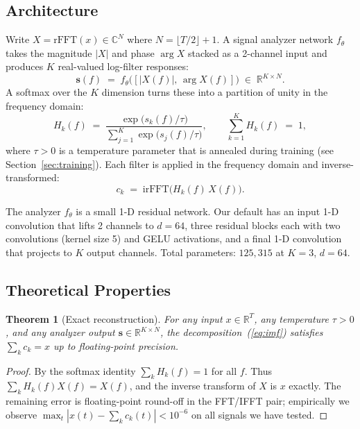 \documentclass[journal]{IEEEtran}
\newtheorem{theorem}{Theorem}
\begin{document}
\subsection{Architecture}

Write $X = \mathrm{rFFT}(x) \in \mathbb{C}^{N}$ where $N = \lfloor T/2 \rfloor + 1$. A signal analyzer network $f_{\theta}$ takes the magnitude $|X|$ and phase $\arg X$ stacked as a 2-channel input and produces $K$ real-valued log-filter responses:
\begin{equation}
\mathbf{s}(f) \;=\; f_{\theta}\bigl([|X(f)|,\, \arg X(f)]\bigr) \;\in\; \mathbb{R}^{K \times N}.
\label{eq:analyzer}
\end{equation}
A softmax over the $K$ dimension turns these into a partition of unity in the frequency domain:
\begin{equation}
H_{k}(f) \;=\; \frac{\exp\!\bigl(s_{k}(f) / \tau\bigr)}{\sum_{j=1}^{K} \exp\!\bigl(s_{j}(f) / \tau\bigr)},
\qquad
\sum_{k=1}^{K} H_{k}(f) \;=\; 1,
\label{eq:softmax-partition}
\end{equation}
where $\tau > 0$ is a temperature parameter that is annealed during training (see Section~\ref{sec:training}). Each filter is applied in the frequency domain and inverse-transformed:
\begin{equation}
c_{k} \;=\; \mathrm{irFFT}\!\bigl(H_{k}(f)\, X(f)\bigr).
\label{eq:imf}
\end{equation}

The analyzer $f_{\theta}$ is a small 1-D residual network. Our default has an input 1-D convolution that lifts 2 channels to $d = 64$, three residual blocks each with two convolutions (kernel size 5) and GELU activations, and a final 1-D convolution that projects to $K$ output channels. Total parameters: $125{,}315$ at $K = 3$, $d = 64$.

\subsection{Theoretical Properties}

\begin{theorem}[Exact reconstruction]
For any input $x \in \mathbb{R}^{T}$, any temperature $\tau > 0$, and any analyzer output $\mathbf{s} \in \mathbb{R}^{K \times N}$, the decomposition~(\ref{eq:imf}) satisfies $\sum_{k} c_{k} = x$ up to floating-point precision.
\end{theorem}
\begin{proof}
By the softmax identity $\sum_{k} H_{k}(f) = 1$ for all $f$. Thus
$\sum_{k} H_{k}(f) X(f) = X(f)$,
and the inverse transform of $X$ is $x$ exactly. The remaining error is floating-point round-off in the FFT/IFFT pair; empirically we observe $\max_{t} |x(t) - \sum_{k} c_{k}(t)| < 10^{-6}$ on all signals we have tested.
\end{proof}
\end{document}
